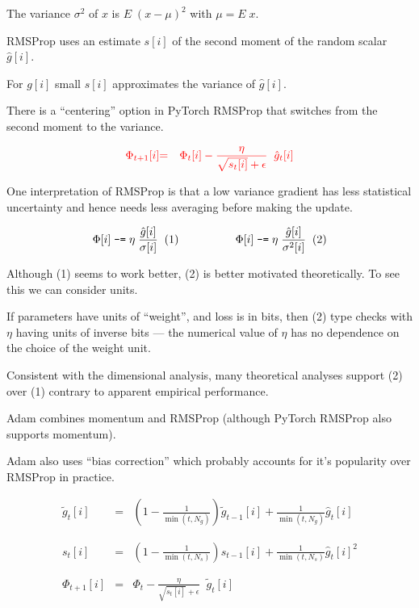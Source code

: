 {\vfill
The variance $\sigma^2$ of $x$ is $E \;(x - \mu)^2$ with $\mu = E\;x$.

\vfill
RMSProp uses an estimate $s[i]$ of the second moment of the random scalar $\hat{g}[i]$.

\vfill
For $g[i]$ small $s[i]$ approximates the variance of $\hat{g}[i]$.

\vfill
There is a ``centering'' option in PyTorch RMSProp that switches from the second moment to the variance.

\begin{eqnarray*}
{\color{red} \Phi_{t+1}[i]} & {\color{red} =} & {\color{red} \Phi_t[i] - \frac{\eta}{\sqrt{s_t[i]} + \epsilon}\;\; \hat{g}_t[i]}
\end{eqnarray*}

\vfill
One interpretation of RMSProp is that a low variance gradient has less statistical uncertainty and hence needs less averaging before making the update.


{\color{red} $$\Phi[i] \;\mbox{\tt -=} \; \eta\;\frac{\hat{g}[i]}{\sigma[i]}\;\;(1)\hspace{5em}\Phi[i] \;\mbox{\tt -=} \; \eta\;\frac{\hat{g}[i]}{\sigma^2[i]}\;\;(2)$$}

\vfill
Although (1) seems to work better, (2) is better motivated theoretically.  To see this we can consider units.

\vfill
If parameters have units of ``weight'', and loss is in bits, then (2) type checks with $\eta$ having units of inverse bits --- the numerical value of $\eta$
has no dependence on the choice of the weight unit.

\vfill
Consistent with the dimensional analysis, many theoretical analyses support (2) over (1) contrary to apparent empirical performance.

Adam combines momentum and RMSProp (although PyTorch RMSProp also supports momentum).

\vfill
Adam also uses ``bias correction'' which probably accounts for it's popularity over RMSProp in practice.


\begin{eqnarray*}
  \tilde{g}_{t}[i] & = & \left(1-\frac{1}{\min(t,N_g)}\right)\tilde{g}_{t-1}[i] + \frac{1}{\min(t,N_g)} \hat{g}_t[i] \\
  \\
  \\
  s_{t}[i] & = & \left(1-\frac{1}{\min(t,N_s)}\right)s_{t-1}[i] + \frac{1}{\min(t,N_s)} \hat{g}_t[i]^2 \\
  \\
  \\
\Phi_{t+1}[i] & =  & \Phi_t - \frac{\eta}{\sqrt{s_{t}[i]} + \epsilon}\;\;\tilde{g}_{t}[i]
\end{eqnarray*}

}

